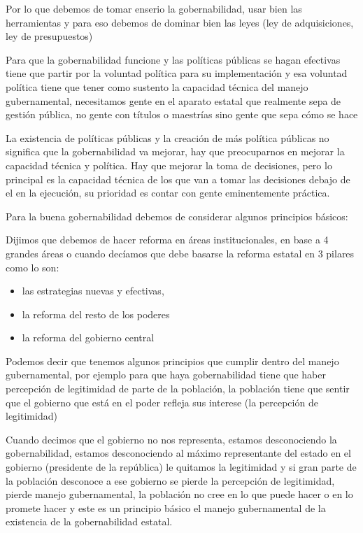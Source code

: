 \documentclass[
  a4paper,
]{article}
\providecommand{\tightlist}{%
  \setlength{\itemsep}{0pt}\setlength{\parskip}{0pt}}\usepackage{longtable,booktabs,array}
\begin{document}
Por lo que debemos de tomar enserio la gobernabilidad, usar bien las
herramientas y para eso debemos de dominar bien las leyes (ley de
adquisiciones, ley de presupuestos)

Para que la gobernabilidad funcione y las políticas públicas se hagan
efectivas tiene que partir por la voluntad política para su
implementación y esa voluntad política tiene que tener como sustento la
capacidad técnica del manejo gubernamental, necesitamos gente en el
aparato estatal que realmente sepa de gestión pública, no gente con
títulos o maestrías sino gente que sepa cómo se hace

La existencia de políticas públicas y la creación de más política
públicas no significa que la gobernabilidad va mejorar, hay que
preocuparnos en mejorar la capacidad técnica y política. Hay que mejorar
la toma de decisiones, pero lo principal es la capacidad técnica de los
que van a tomar las decisiones debajo de el en la ejecución, su
prioridad es contar con gente eminentemente práctica.

Para la buena gobernabilidad debemos de considerar algunos principios
básicos:

Dijimos que debemos de hacer reforma en áreas institucionales, en base a
4 grandes áreas o cuando decíamos que debe basarse la reforma estatal en
3 pilares como lo son:

\begin{itemize}
\tightlist
\item
  las estrategias nuevas y efectivas,
\item
  la reforma del resto de los poderes
\item
  la reforma del gobierno central
\end{itemize}

Podemos decir que tenemos algunos principios que cumplir dentro del
manejo gubernamental, por ejemplo para que haya gobernabilidad tiene que
haber percepción de legitimidad de parte de la población, la población
tiene que sentir que el gobierno que está en el poder refleja sus
interese (la percepción de legitimidad)

Cuando decimos que el gobierno no nos representa, estamos desconociendo
la gobernabilidad, estamos desconociendo al máximo representante del
estado en el gobierno (presidente de la república) le quitamos la
legitimidad y si gran parte de la población desconoce a ese gobierno se
pierde la percepción de legitimidad, pierde manejo gubernamental, la
población no cree en lo que puede hacer o en lo promete hacer y este es
un principio básico el manejo gubernamental de la existencia de la
gobernabilidad estatal.
\end{document}
